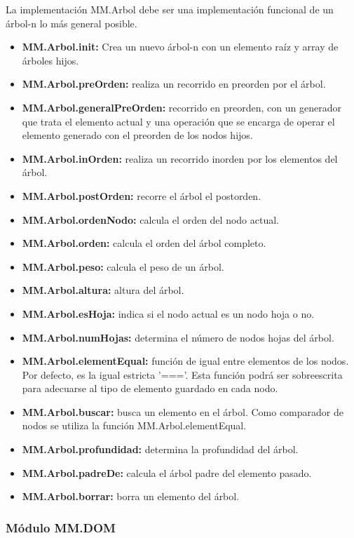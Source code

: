 La implementación MM.Arbol debe ser una implementación funcional de un árbol-n lo más general posible. 

\begin{itemize}
\item \textbf{MM.Arbol.init:} Crea un nuevo árbol-n con un elemento raíz y array de árboles hijos.
\item \textbf{MM.Arbol.preOrden:} realiza un recorrido en preorden por el árbol.
\item \textbf{MM.Arbol.generalPreOrden:} recorrido en preorden, con un generador que trata el elemento actual y una operación que se encarga de operar el elemento generado con el preorden de los nodos hijos.
\item \textbf{MM.Arbol.inOrden:} realiza un recorrido inorden por los elementos del árbol.
\item \textbf{MM.Arbol.postOrden:} recorre el árbol el postorden.
\item \textbf{MM.Arbol.ordenNodo:} calcula el orden del nodo actual.
\item \textbf{MM.Arbol.orden:} calcula el orden del árbol completo.
\item \textbf{MM.Arbol.peso:} calcula el peso de un árbol.
\item \textbf{MM.Arbol.altura:} altura del árbol.
\item \textbf{MM.Arbol.esHoja:} indica si el nodo actual es un nodo hoja o no.
\item \textbf{MM.Arbol.numHojas:} determina el número de nodos hojas del árbol.
\item \textbf{MM.Arbol.elementEqual:} función de igual entre elementos de los nodos. Por defecto, es la igual estricta '==='. Esta función podrá ser sobreescrita para adecuarse al tipo de elemento guardado en cada nodo.
\item \textbf{MM.Arbol.buscar:} busca un elemento en el árbol. Como comparador de nodos se utiliza la función MM.Arbol.elementEqual.
\item \textbf{MM.Arbol.profundidad:} determina la profundidad del árbol.
\item \textbf{MM.Arbol.padreDe:} calcula el árbol padre del elemento pasado.
\item \textbf{MM.Arbol.borrar:} borra un elemento del árbol.
\end{itemize}



\subsubsection{Módulo MM.DOM}

